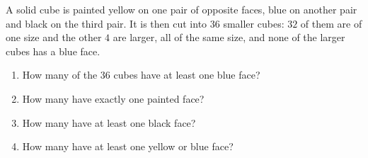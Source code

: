 A solid cube is painted yellow on one pair of opposite faces, blue on another pair and black on the third pair. It is then cut into $36$ smaller cubes: $32$ of them are of one size and the other $4$ are larger, all of the same size, and none of the larger cubes has a blue face.
\begin{enumerate}
\item[(a)] How many of the $36$ cubes have at least one blue face?
\item[(b)] How many have exactly one painted face?
\item[(c)] How many have at least one black face?
\item[(d)] How many have at least one yellow or blue face?
\end{enumerate}
